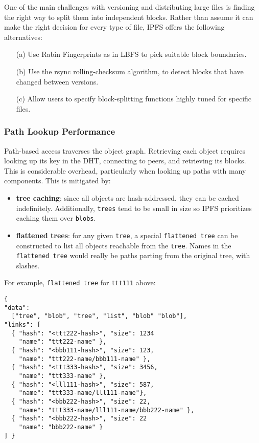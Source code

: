 \documentclass{sig-alternate}
\begin{document}
One of the main challenges with versioning and distributing large files is finding the right way to split them into independent blocks. Rather than assume it can make the right decision for every type of file, IPFS offers the following alternatives:

\begin{enumerate}
  \item[(a)] Use Rabin Fingerprints \cite{RabinFingerprints} as in LBFS \cite{LBFS} to pick suitable block boundaries.
  \item[(b)] Use the rsync \cite{rsync} rolling-checksum algorithm, to detect blocks that have changed between versions.
  \item[(c)] Allow users to specify block-splitting functions highly tuned for specific files.
\end{enumerate}

\subsubsection{Path Lookup Performance}

Path-based access traverses the object graph. Retrieving
each object requires looking up its key in the DHT,
connecting to peers, and retrieving its blocks. This is considerable
overhead, particularly when looking up paths with many components.
This is mitigated by:

\begin{itemize}
  \item \textbf{tree caching}: since all objects are hash-addressed, they
        can be cached indefinitely. Additionally, \texttt{trees} tend to be
        small in size so IPFS prioritizes caching them over \texttt{blobs}.
  \item \textbf{flattened trees}: for any given \texttt{tree}, a special
        \texttt{flattened tree} can be constructed to list all objects
        reachable from the \texttt{tree}. Names in the \texttt{flattened tree}
        would really be paths parting from the original tree, with slashes.
\end{itemize}

For example, \texttt{flattened tree} for \texttt{ttt111} above:

\begin{verbatim}
{
"data":
  ["tree", "blob", "tree", "list", "blob" "blob"],
"links": [
  { "hash": "<ttt222-hash>", "size": 1234
    "name": "ttt222-name" },
  { "hash": "<bbb111-hash>", "size": 123,
    "name": "ttt222-name/bbb111-name" },
  { "hash": "<ttt333-hash>", "size": 3456,
    "name": "ttt333-name" },
  { "hash": "<lll111-hash>", "size": 587,
    "name": "ttt333-name/lll111-name"},
  { "hash": "<bbb222-hash>", "size": 22,
    "name": "ttt333-name/lll111-name/bbb222-name" },
  { "hash": "<bbb222-hash>", "size": 22
    "name": "bbb222-name" }
] }
\end{verbatim}
\end{document}
